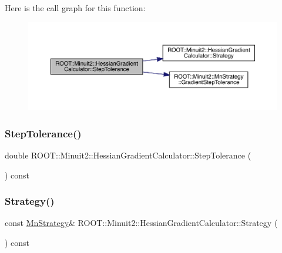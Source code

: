 Here is the call graph for this function\+:\nopagebreak
\begin{figure}[H]
\begin{center}
\leavevmode
\includegraphics[width=350pt]{dc/d17/classROOT_1_1Minuit2_1_1HessianGradientCalculator_ac66592218817d4cbc8a3be76938b435d_cgraph}
\end{center}
\end{figure}
\mbox{\label{classROOT_1_1Minuit2_1_1HessianGradientCalculator_ac66592218817d4cbc8a3be76938b435d}} 
\subsubsection{\texorpdfstring{StepTolerance()}{StepTolerance()}\hspace{0.1cm}{\footnotesize\ttfamily [2/2]}}
{\footnotesize\ttfamily double R\+O\+O\+T\+::\+Minuit2\+::\+Hessian\+Gradient\+Calculator\+::\+Step\+Tolerance (\begin{DoxyParamCaption}{ }\end{DoxyParamCaption}) const}

\mbox{\label{classROOT_1_1Minuit2_1_1HessianGradientCalculator_a407171e2df12fa67e92c0e5b7a97bb8d}} 
\subsubsection{\texorpdfstring{Strategy()}{Strategy()}\hspace{0.1cm}{\footnotesize\ttfamily [1/2]}}
{\footnotesize\ttfamily const \mbox{\hyperlink{classROOT_1_1Minuit2_1_1MnStrategy}{Mn\+Strategy}}\& R\+O\+O\+T\+::\+Minuit2\+::\+Hessian\+Gradient\+Calculator\+::\+Strategy (\begin{DoxyParamCaption}{ }\end{DoxyParamCaption}) const\hspace{0.3cm}{\ttfamily [inline]}}

